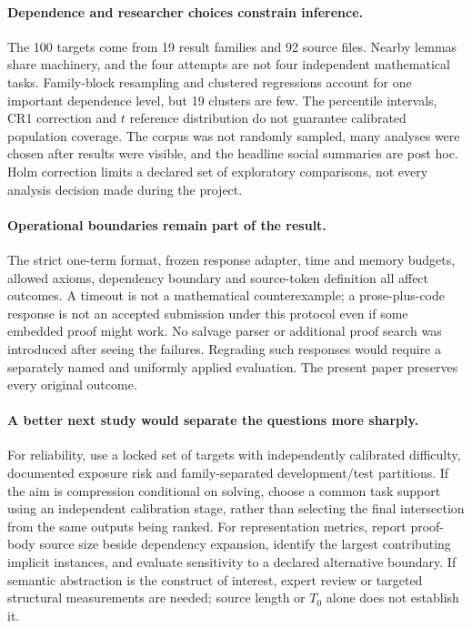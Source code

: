 \documentclass[11pt]{article}
\begin{document}
\paragraph{Dependence and researcher choices constrain inference.}
The 100 targets come from 19 result families and 92 source files. Nearby lemmas share machinery, and the four attempts are not four independent mathematical tasks. Family-block resampling and clustered regressions account for one important dependence level, but 19 clusters are few. The percentile intervals, CR1 correction and $t$ reference distribution do not guarantee calibrated population coverage. The corpus was not randomly sampled, many analyses were chosen after results were visible, and the headline social summaries are post hoc. Holm correction limits a declared set of exploratory comparisons, not every analysis decision made during the project.

\paragraph{Operational boundaries remain part of the result.}
The strict one-term format, frozen response adapter, time and memory budgets, allowed axioms, dependency boundary and source-token definition all affect outcomes. A timeout is not a mathematical counterexample; a prose-plus-code response is not an accepted submission under this protocol even if some embedded proof might work. No salvage parser or additional proof search was introduced after seeing the failures. Regrading such responses would require a separately named and uniformly applied evaluation. The present paper preserves every original outcome.

\paragraph{A better next study would separate the questions more sharply.}
For reliability, use a locked set of targets with independently calibrated difficulty, documented exposure risk and family-separated development/test partitions. If the aim is compression conditional on solving, choose a common task support using an independent calibration stage, rather than selecting the final intersection from the same outputs being ranked. For representation metrics, report proof-body source size beside dependency expansion, identify the largest contributing implicit instances, and evaluate sensitivity to a declared alternative boundary. If semantic abstraction is the construct of interest, expert review or targeted structural measurements are needed; source length or $T_0$ alone does not establish it.
\end{document}
